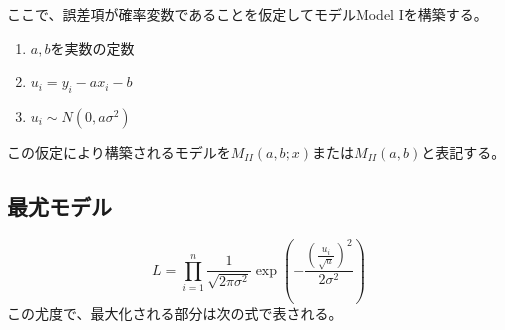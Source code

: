 ここで、誤差項が確率変数であることを仮定してモデルModel Iを構築する。
\begin{enumerate}
 \item $a,b$を実数の定数
 \item $u_i = y_i-a x_i -b$
 \item $u_i \sim N(0,a\sigma^2)$
\end{enumerate}
この仮定により構築されるモデルを$M_{II}(a,b; x)$または$M_{II}(a,b)$と表記する。
\subsection{最尤モデル}
\begin{equation*}
 L = \prod_{i=1}^n\frac{1}{\sqrt{2\pi\sigma^2}}\exp\left(-\frac{(\frac{u_i}{\sqrt{a}})^2}{2\sigma^2} \right)
\end{equation*}
この尤度で、最大化される部分は次の式で表される。
\fi




